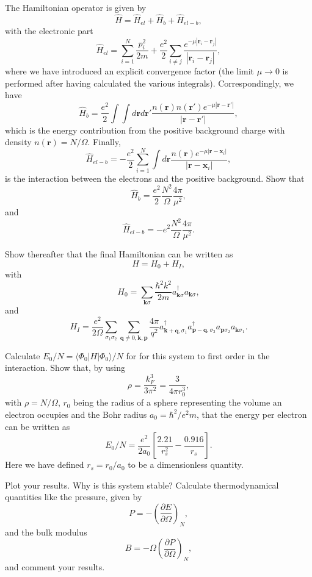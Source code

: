 \documentclass[graybox,sectrefs,envcountresetchap,open=right]{svmonodo}
\newenvironment{doconceexercise}{}{}
\begin{document}
\begin{doconceexercise}
The Hamiltonian operator is given by
\[
\hat{H}=\hat{H}_{el}+\hat{H}_{b}+\hat{H}_{el-b},
\]
with the electronic part
\[
\hat{H}_{el}=\sum_{i=1}^N\frac{p_i^2}{2m}+\frac{e^2}{2}\sum_{i\ne j}\frac{e^{-\mu |\mathbf{r}_i-\mathbf{r}_j|}}{|\mathbf{r}_i-\mathbf{r}_j|},
\]
where we have introduced an explicit convergence factor
(the limit $\mu\rightarrow 0$ is performed after having calculated the various integrals).
Correspondingly, we have
\[
\hat{H}_{b}=\frac{e^2}{2}\int\int d\mathbf{r}d\mathbf{r}'\frac{n(\mathbf{r})n(\mathbf{r}')e^{-\mu |\mathbf{r}-\mathbf{r}'|}}{|\mathbf{r}-\mathbf{r}'|},
\]
which is the energy contribution from the positive background charge with density
$n(\mathbf{r})=N/\Omega$. Finally,
\[
\hat{H}_{el-b}=-\frac{e^2}{2}\sum_{i=1}^N\int d\mathbf{r}\frac{n(\mathbf{r})e^{-\mu |\mathbf{r}-\mathbf{x}_i|}}{|\mathbf{r}-\mathbf{x}_i|},
\]
is the interaction between the electrons and the positive background.
Show that
\[
\hat{H}_{b}=\frac{e^2}{2}\frac{N^2}{\Omega}\frac{4\pi}{\mu^2},
\]
and
\[
\hat{H}_{el-b}=-e^2\frac{N^2}{\Omega}\frac{4\pi}{\mu^2}.
\]

Show thereafter that the final Hamiltonian can be written as 
\[
H=H_{0}+H_{I},
\]
with
\[
H_{0}={\displaystyle\sum_{\mathbf{k}\sigma}}
\frac{\hbar^{2}k^{2}}{2m}a_{\mathbf{k}\sigma}^{\dagger}
a_{\mathbf{k}\sigma},
\]
and
\[
H_{I}=\frac{e^{2}}{2\Omega}{\displaystyle\sum_{\sigma_{1}\sigma_{2}}}{\displaystyle\sum_{\mathbf{q}\neq 0,\mathbf{k},\mathbf{p}}}\frac{4\pi}{q^{2}}
a_{\mathbf{k}+\mathbf{q},\sigma_{1}}^{\dagger}
a_{\mathbf{p}-\mathbf{q},\sigma_{2}}^{\dagger}
a_{\mathbf{p}\sigma_{2}}a_{\mathbf{k}\sigma_{1}}.
\] 

Calculate $E_0/N=\langle \Phi_{0}\vert H\vert \Phi_{0}\rangle/N$ for for this system to first order in the interaction. Show that, by using
\[
\rho= \frac{k_F^3}{3\pi^2}=\frac{3}{4\pi r_0^3},
\]
with $\rho=N/\Omega$, $r_0$
being the radius of a sphere representing the volume an electron occupies 
and the Bohr radius $a_0=\hbar^2/e^2m$, 
that the energy per electron can be written as 
\[
E_0/N=\frac{e^2}{2a_0}\left[\frac{2.21}{r_s^2}-\frac{0.916}{r_s}\right].
\]
Here we have defined
$r_s=r_0/a_0$ to be a dimensionless quantity.

Plot your results. Why is this system stable?
Calculate thermodynamical quantities like the pressure, given by
\[
P=-\left(\frac{\partial E}{\partial \Omega}\right)_N,
\]
and the bulk modulus
\[
B=-\Omega\left(\frac{\partial P}{\partial \Omega}\right)_N,
\]
and comment your results.


\end{doconceexercise}
\end{document}
